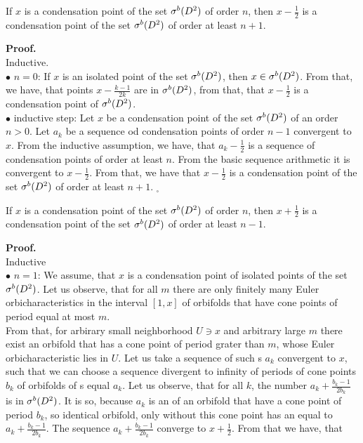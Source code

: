\begin{lemma}\label{first_order_lemma}
If $x$ is a condensation point of the set ${\mathcal{\sigma}^b(D^2)}$ of order $n$, then $x-\frac{1}{2}$ is a
 condensation point of the set ${\mathcal{\sigma}^b(D^2)}$ of order at least $n+1$. 
\end{lemma}
\textbf{Proof.} \\
Inductive. \\
$\bullet$ $n = 0$: If $x$ is an isolated point of the set ${\mathcal{\sigma}^b(D^2)}$, then $x \in {\mathcal{\sigma}^b(D^2)}$. From that, we 
have, that points $x - \frac{k-1}{2k}$ are in ${\mathcal{\sigma}^b(D^2)}$, from that, that $x-\frac{1}{2}$ is a 
condensation point of ${\mathcal{\sigma}^b(D^2)}$. \\
$\bullet$ inductive step: Let $x$ be a condensation point of the set ${\mathcal{\sigma}^b(D^2)}$ of an order $n > 0$. 
Let $a_k$ be a sequence od condensation points of order $n-1$ convergent to $x$. From the 
inductive assumption, we have, that $a_k - \frac{1}{2}$ is a sequence of condensation points 
of order at least $n$. From the basic sequence arithmetic it is convergent to $x-\frac{1}{2}$. 
From that, we have that $x-\frac{1}{2}$ is a condensation point of the set ${\mathcal{\sigma}^b(D^2)}$ of order 
at least $n+1$. $_\square$
\begin{lemma}\label{second_order_lemma}
If $x$ is a condensation point of the set ${\mathcal{\sigma}^b(D^2)}$ of order $n$, then $x+\frac{1}{2}$ is 
a condensation point of the set ${\mathcal{\sigma}^b(D^2)}$ of order at least $n-1$.  
\end{lemma}
\noindent\textbf{Proof.} \\
Inductive \\
$\bullet$ $n = 1$: We assume, that $x$ is a condensation point of isolated points of the set 
${\mathcal{\sigma}^b(D^2)}$. Let us observe, that for all $m$ there are only finitely many Euler orbicharacteristics 
in the interval $[1,x]$ of orbifolds that have cone points of period equal at most $m$. \\ 
From that, for arbirary small neighborhood $U \ni x$ and arbitrary large $m$ there exist an orbifold 
that has a cone point of period grater than $m$, whose Euler orbicharacteristic lies in $U$. 
Let us take a sequence of such \Eoc s $a_k$ convergent to $x$, such that we can choose 
a sequence divergent to infinity of periods of cone points $b_k$ of orbifolds of \Eoc s equal $a_k$. 
Let us observe, that for all $k$, the number $a_k+\frac{b_k-1}{2b_k}$ is in ${\mathcal{\sigma}^b(D^2)}$. 
It is so, because $a_k$ is an \Eoc of an orbifold that have a cone point of period $b_k$, so 
identical orbifold, only without this cone point has an \Eoc equal to $a_k + \frac{b_k-1}{2b_k}$. 
The sequence $a_k + \frac{b_k-1}{2b_k}$ converge to $x+\frac{1}{2}$. From that we have, that 
